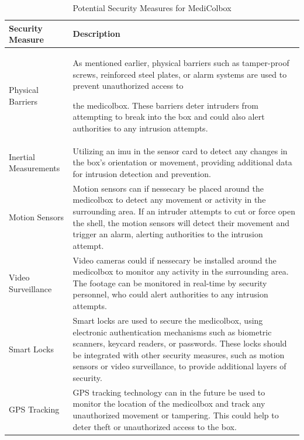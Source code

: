 \documentclass[../main.tex]{subfiles}
\begin{document}
\begin{table}[htbp]
    \centering
    \caption{Potential Security Measures for MediColbox}
    \label{tab:PotentialSecurityMeasuresForMediColbox}
    \begin{tabular}{|l|p{10cm}|} \hline
        \textbf{Security Measure} & \textbf{Description} \\ \hline
        
        Physical Barriers &
        As mentioned earlier,
        physical barriers such as tamper-proof screws,
        reinforced steel plates,
        or alarm systems are used to prevent unauthorized access to
        
        the \gls{medicolbox}.
        These barriers deter intruders from attempting to
        break into the box and could also alert authorities to
        any intrusion attempts. \\ \hline
        
        Inertial Measurements &
        Utilizing an \gls{imu} in the
        sensor card to detect any changes in the box's orientation or
        movement, providing additional data for
        intrusion detection and prevention. \\ \hline
        
        Motion Sensors &
        Motion sensors can if nessecary be placed around the
        \gls{medicolbox} to detect any movement or
        activity in the surrounding area.
        If an intruder attempts to cut or force open the shell,
        the motion sensors will detect their movement and
        trigger an alarm,
        alerting authorities to the intrusion attempt. \\ \hline
        
        Video Surveillance &
        Video cameras could if nessecary be installed around the \gls{medicolbox} to monitor any activity in the surrounding area. The footage can be monitored in real-time by security personnel, who could alert authorities to any intrusion attempts. \\ \hline

        Smart Locks &
        Smart locks are used to secure the \gls{medicolbox}, using electronic authentication mechanisms such as biometric scanners, keycard readers, or passwords. These locks should be integrated with other security measures, such as motion sensors or video surveillance, to provide additional layers of security. \\ \hline
        
        GPS Tracking &
        GPS tracking technology can in the future be used to monitor the location of the \gls{medicolbox} and track any unauthorized movement or tampering. This could help to deter theft or unauthorized access to the box. \\ \hline
    \end{tabular}
\end{table}
\end{document}
